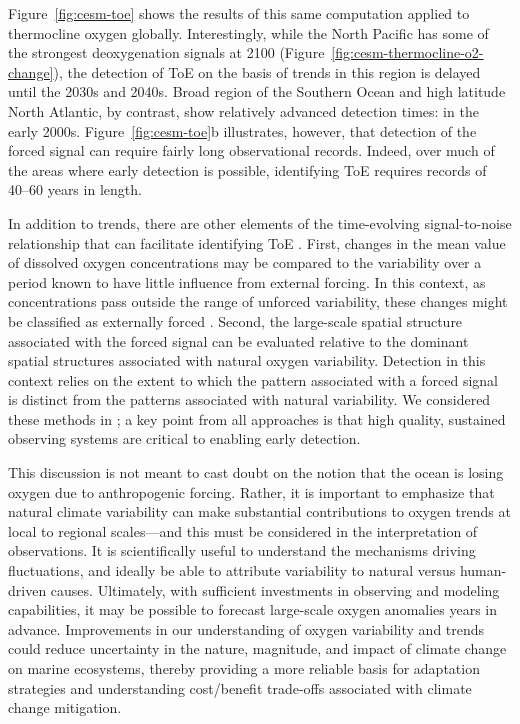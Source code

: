 \documentclass[draft,linenumbers]{report_chapter}
\begin{document}
Figure~\ref{fig:cesm-toe} shows the results of this same computation applied to thermocline oxygen globally.
Interestingly, while the North Pacific has some of the strongest deoxygenation signals at 2100 (Figure~\ref{fig:cesm-thermocline-o2-change}), the detection of ToE on the basis of trends in this region is delayed until the 2030s and 2040s.
Broad region of the Southern Ocean and high latitude North Atlantic, by contrast, show relatively advanced detection times: in the early 2000s.
Figure~\ref{fig:cesm-toe}b illustrates, however, that detection of the forced signal can require fairly long observational records.
Indeed, over much of the areas where early detection is possible, identifying ToE requires records of 40--60 years in length.

In addition to trends, there are other elements of the time-evolving signal-to-noise relationship that can facilitate identifying ToE \citep{Santer-Bruggemann-etal-1994}.
First, changes in the mean value of dissolved oxygen concentrations may be compared to the variability over a period known to have little influence from external forcing.
In this context, as concentrations pass outside the range of unforced variability, these changes might be classified as externally forced \citep{Christian-2014}.
Second, the large-scale spatial structure associated with the forced signal can be evaluated relative to the dominant spatial structures associated with natural oxygen variability.
Detection in this context relies on the extent to which the pattern associated with a forced signal is distinct from the patterns associated with natural variability.
We considered these methods in \citet{Long-Deutsch-etal-2016}; a key point from all approaches is that high quality, sustained observing systems are critical to enabling early detection.

This discussion is not meant to cast doubt on the notion that the ocean is losing oxygen due to anthropogenic forcing.
Rather, it is important to emphasize that natural climate variability can make substantial contributions to oxygen trends at local to regional scales---and this must be considered in the interpretation of observations.
It is scientifically useful to understand the mechanisms driving  fluctuations, and ideally be able to attribute variability to natural versus human-driven causes.
Ultimately, with sufficient investments in observing and modeling capabilities, it may be possible to forecast large-scale oxygen anomalies years in advance.
Improvements in our understanding of oxygen variability and trends could reduce uncertainty in the nature, magnitude, and impact of climate change on marine ecosystems, thereby providing a more reliable basis for adaptation strategies and understanding cost/benefit trade-offs associated with climate change mitigation.
\end{document}
